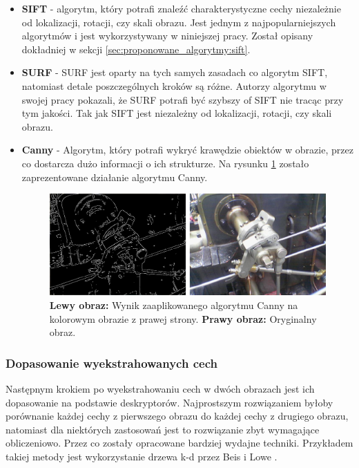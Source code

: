 \begin{itemize}
\item \textbf{SIFT} \cite{Lowe:1999} - algorytm, który potrafi znaleźć charakterystyczne cechy niezależnie od lokalizacji, rotacji, czy skali obrazu. Jest jednym z najpopularniejszych algorytmów i jest wykorzystywany w niniejszej pracy. Został opisany dokładniej w sekcji \ref{sec:proponowane_algorytmy:sift}.
\item \textbf{SURF} \cite{Bay:2008} - SURF jest oparty na tych samych zasadach co algorytm SIFT, natomiast detale poszczególnych kroków są różne. Autorzy algorytmu w swojej pracy pokazali, że SURF potrafi być szybszy of SIFT nie tracąc przy tym jakości. Tak jak SIFT jest niezależny od lokalizacji, rotacji, czy skali obrazu.
\item \textbf{Canny} \cite{Canny:1986} - Algorytm, który potrafi wykryć krawędzie obiektów w obrazie, przez co dostarcza dużo informacji o ich strukturze. Na rysunku \ref{fig:algorytmy_korejestracji:canny} zostało zaprezentowane działanie algorytmu Canny.

\begin{figure}[H]
  \centering
  \includegraphics[width=\textwidth]{gfx/canny}
  \caption{\textbf{Lewy obraz:} Wynik zaaplikowanego algorytmu Canny na kolorowym obrazie z prawej strony. \textbf{Prawy obraz:} Oryginalny obraz.}
  \label{fig:algorytmy_korejestracji:canny}
\end{figure}

\end{itemize}

\subsubsection{Dopasowanie wyekstrahowanych cech}

Następnym krokiem po wyekstrahowaniu cech w dwóch obrazach jest ich dopasowanie na podstawie deskryptorów. Najprostszym rozwiązaniem byłoby porównanie każdej cechy z pierwszego obrazu do każdej cechy z drugiego obrazu, natomiast dla niektórych zastosowań jest to rozwiązanie zbyt wymagające obliczeniowo. Przez co zostały opracowane bardziej wydajne techniki. Przykładem takiej metody jest wykorzystanie drzewa k-d przez Beis i Lowe \cite{Beis:1997}.

